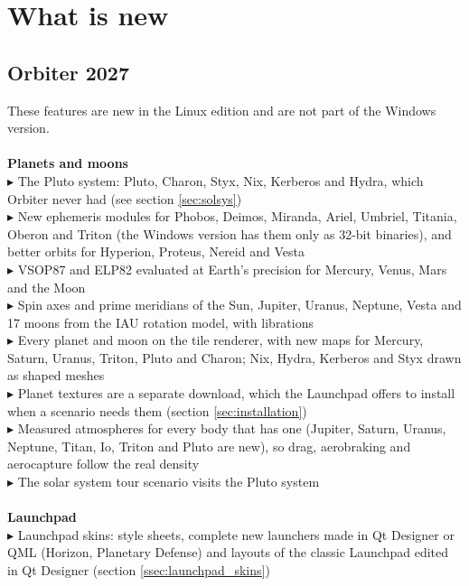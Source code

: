 \documentclass[Orbiter User Manual.tex]{subfiles}
\begin{document}
\section{What is new}

\subsection{Orbiter 2027}
These features are new in the Linux edition and are not part of the Windows version.\\
\\
\textbf{Planets and moons}\\
$\blacktriangleright$ The Pluto system: Pluto, Charon, Styx, Nix, Kerberos and Hydra, which Orbiter never had (see section \ref{sec:solsys})\\
$\blacktriangleright$ New ephemeris modules for Phobos, Deimos, Miranda, Ariel, Umbriel, Titania, Oberon and Triton (the Windows version has them only as 32-bit binaries), and better orbits for Hyperion, Proteus, Nereid and Vesta\\
$\blacktriangleright$ VSOP87 and ELP82 evaluated at Earth's precision for Mercury, Venus, Mars and the Moon\\
$\blacktriangleright$ Spin axes and prime meridians of the Sun, Jupiter, Uranus, Neptune, Vesta and 17 moons from the IAU rotation model, with librations\\
$\blacktriangleright$ Every planet and moon on the tile renderer, with new maps for Mercury, Saturn, Uranus, Triton, Pluto and Charon; Nix, Hydra, Kerberos and Styx drawn as shaped meshes\\
$\blacktriangleright$ Planet textures are a separate download, which the Launchpad offers to install when a scenario needs them (section \ref{sec:installation})\\
$\blacktriangleright$ Measured atmospheres for every body that has one (Jupiter, Saturn, Uranus, Neptune, Titan, Io, Triton and Pluto are new), so drag, aerobraking and aerocapture follow the real density\\
$\blacktriangleright$ The solar system tour scenario visits the Pluto system\\
\\
\textbf{Launchpad}\\
$\blacktriangleright$ Launchpad skins: style sheets, complete new launchers made in Qt Designer or QML (Horizon, Planetary Defense) and layouts of the classic Launchpad edited in Qt Designer (section \ref{ssec:launchpad_skins})\\
\end{document}
